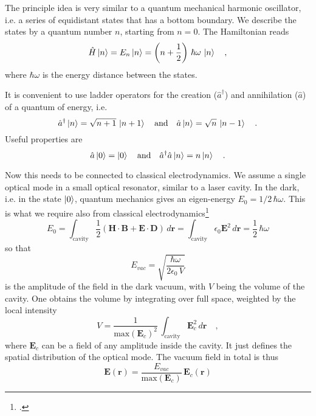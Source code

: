 The principle idea is very similar to a quantum mechanical harmonic oscillator, i.e. a series of equidistant states that has a bottom boundary. We describe the states by a quantum number $n$, starting from $n=0$. The Hamiltonian reads
\begin{equation}
\hat{H} \ket{n} = E_n \ket{n} = \left( n + \frac{1}{2} \right) \, \hbar \omega \, \ket{n} \quad ,
\end{equation}
where $\hbar \omega$ is the energy distance between the states.

It is convenient to use ladder operators for the creation ($\hat{a}^\dagger$) and annihilation ($\hat{a}$) of  a quantum of energy, i.e.
\begin{equation}
 \hat{a}^\dagger \ket{n} = \sqrt{n+1}\, \ket{n+1}  \quad \text{and} \quad
  \hat{a} \ket{n} = \sqrt{n}\, \ket{n-1} \quad .
\end{equation}
Useful properties are 
\begin{equation}
 \hat{a} \ket{0} = \ket{0}  \quad \text{and} \quad
  \hat{a}^\dagger  \hat{a} \ket{n} = n \ket{n} \quad .
\end{equation}

Now this needs to be connected to  classical electrodynamics. We assume a single optical mode in a small optical resonator, similar to a laser cavity. In the dark, i.e. in the state $\ket{0}$, quantum mechanics gives an eigen-energy $E_0 = 1/2 \, \hbar \omega$. This is what we require also from classical electrodynamics\footcite[chap. 7.5]{Fox}
\begin{equation}
E_0 = 
 \int_\text{cavity} \frac{1}{2} 
 \left( \boldsymbol{H} \cdot  \boldsymbol{B} + \boldsymbol{E} \cdot  \boldsymbol{D} \right) \, d\boldsymbol{r} = 
  \int_\text{cavity}  \epsilon_0 \boldsymbol{E}^2 \, d\boldsymbol{r} = \frac{1}{2} \, \hbar \omega
\end{equation}
so that
\begin{equation}
E_{vac} = \sqrt{\frac{\hbar \omega}{2 \epsilon_0 \, V}}
\end{equation}
is the amplitude of the field in the dark vacuum, with $V$ being the volume of the cavity. One obtains the volume by integrating over full space, weighted by the local intensity
\begin{equation}
V =  \frac{1}{\text{max}(\boldsymbol{E}_c)^2} \, \int_\text{cavity} \boldsymbol{E}_c^2\, d\boldsymbol{r} \quad ,
\end{equation}
where $\boldsymbol{E}_c$ can be a field of any amplitude inside the cavity. It just defines the spatial distribution of the optical mode. The vacuum field in total is thus
\begin{equation}
\boldsymbol{E}( \boldsymbol{r} ) = 
\frac{  E_{vac}  }{\text{max}(\boldsymbol{E}_c)}
 \, \boldsymbol{E}_c ( \boldsymbol{r} )
\end{equation}


